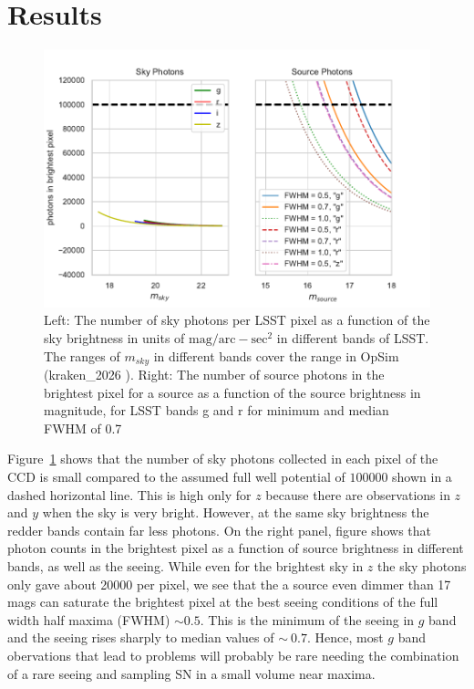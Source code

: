 \documentclass[\docopts]{\docclass}
\begin{document}
\section{Results}
\label{sec:results}
\begin{figure}
\includegraphics[width=0.9\columnwidth]{collected_photons}
\caption{Left: The number of sky photons per LSST pixel as a function of the sky brightness in units of $\mathrm{mag/arc-sec^2}$ in different bands of LSST. The ranges of $m_{sky}$ in different bands cover the range in OpSim (kraken\_2026 ). Right: The number of source photons in the brightest pixel for a source as a function of the source brightness in magnitude, for LSST bands g and r for minimum and median FWHM of 0.7\label{fig:collected_photons}}
\end{figure}
Figure~\ref{fig:collected_photons} shows that the number of sky photons collected in each pixel of the CCD is small compared to the assumed full well potential of $100000$ shown in a dashed horizontal line. This is high only for $z$ because there are observations in $z$ and $y$ when the sky is very bright. However, at the same sky brightness the redder bands contain far less photons. On the right panel,  figure shows that photon counts in the brightest pixel as a function of source brightness in different bands, as well as the seeing. While even for the brightest sky in $z$ the sky photons only gave about 20000 per pixel, we see that the a source even dimmer than 17 mags can saturate the brightest pixel at the best seeing conditions of the full width half maxima (FWHM) $\sim 0.5.$ This is the minimum of the seeing in $g$ band and the seeing rises sharply to median values of $\sim~0.7.$ Hence, most $g$ band obervations that lead to problems will probably be rare needing the combination of a rare seeing and sampling SN in a small volume near maxima.
\end{document}
